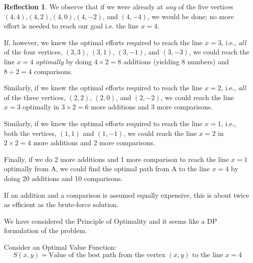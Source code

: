 \documentclass[english,notitlepage,smartquotes]{hgbreport}
\theoremstyle{definition}
\theoremstyle{definition}
\theoremstyle{remark}
\theoremstyle{definition}
\theoremstyle{plain}
\theoremstyle{definition}
\newtheorem{reflection}{Reflection}
\begin{document}
\begin{reflection}
We observe that if we were already at \emph{any} of the five vertices $(4,4)$,$(4,2)$,$(4,0)$,$(4,-2)$, and $(4,-4)$, we would be done; no more effort is needed to reach our goal i.e. the line $x=4$. 

If, however, we knew the optimal efforts required to reach the line $x=3$, i.e., \emph{all} of the four vertices, $(3,3)$, $(3,1)$, $(3,-1)$, and $(3,-3)$, we could reach the line $x=4$ \emph{optimally} by doing $4\times2=8$ additions (yielding 8 numbers) and $8\div2=4$ comparisons.

Similarly, if we knew the optimal efforts required to reach the line $x=2$, i.e., \emph{all} of the three vertices, $(2,2)$, $(2,0)$, and $(2,-2)$, we could reach the line $x=3$ optimally in $3\times2=6$ more additions and 3 more comparisons.

Similarly, if we knew the optimal efforts required to reach the line $x=1$, i.e., both the vertices, $(1,1)$ and $(1,-1)$, we could reach the line $x=2$ in $2\times2=4$ more additions and 2 more comparisons.

Finally, if we do 2 more additions and 1 more comparison to reach the line $x=1$ optimally from A, we could find the optimal path from A to the line $x=4$ by doing 20 additions and 10 comparisons.

If an addition and a comparison is assumed equally expensive, this is about twice as efficient as the brute-force solution.

We have considered the Principle of Optimality and it seems like a DP formulation of the problem.
\end{reflection}

Consider an Optimal Value Function:
\begin{equation}
S(x,y)=\text{Value of the best path from the vertex $(x,y)$ to the line $x=4$}
\label{eq:p11ovf}
\end{equation}
\end{document}
